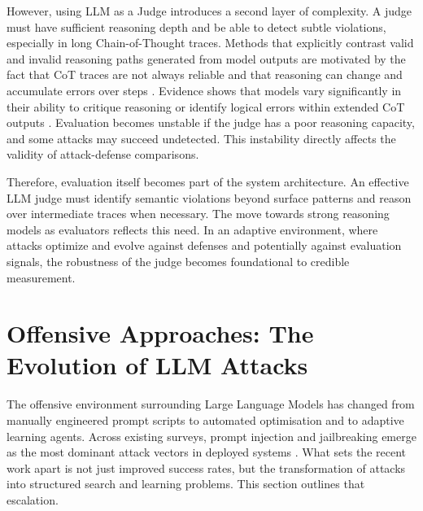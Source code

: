 \documentclass[conference]{IEEEtran}
\begin{document}
However, using LLM as a Judge introduces a second layer of complexity. A judge must have sufficient reasoning depth and be able to detect subtle violations, especially in long Chain-of-Thought traces. Methods that explicitly contrast valid and invalid reasoning paths generated from model outputs are motivated by the fact that CoT traces are not always reliable and that reasoning can change and accumulate errors over steps \cite{b26}. Evidence shows that models vary significantly in their ability to critique reasoning or identify logical errors within extended CoT outputs \cite{b8}. Evaluation becomes unstable if the judge has a poor reasoning capacity, and some attacks may succeed undetected. This instability directly affects the validity of attack-defense comparisons.

Therefore, evaluation itself becomes part of the system architecture. An effective LLM judge must identify semantic violations beyond surface patterns and reason over intermediate traces when necessary. The move towards strong reasoning models as evaluators reflects this need. In an adaptive environment, where attacks optimize and evolve against defenses and potentially against evaluation signals, the robustness of the judge becomes foundational to credible measurement.

\section{Offensive Approaches: The Evolution of LLM Attacks}

The offensive environment surrounding Large Language Models has changed from manually engineered prompt scripts to automated optimisation and to adaptive learning agents. Across existing surveys, prompt injection and jailbreaking emerge as the most dominant attack vectors in deployed systems \cite{b1,b2,b3,b4}. What sets the recent work apart is not just improved success rates, but the transformation of attacks into structured search and learning problems. This section outlines that escalation.
\end{document}

